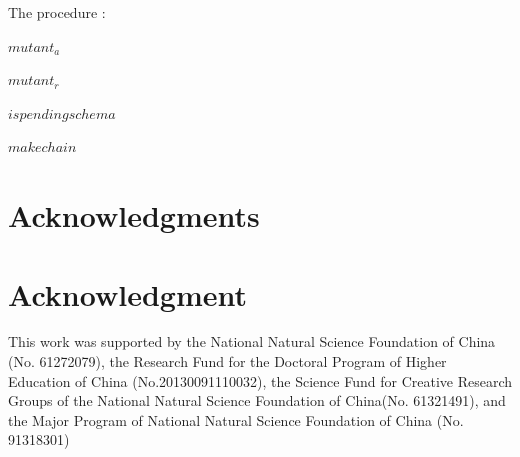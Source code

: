\documentclass[10pt,journal,cspaper,compsoc]{IEEEtran}
\begin{document}
The procedure :

$mutant_a$

$mutant_r$

$is pending schema$

$makechain$


\ifCLASSOPTIONcompsoc
  \section*{Acknowledgments}
\else
  \section*{Acknowledgment}
\fi


This work was supported by the National Natural Science Foundation of China (No. 61272079), the Research Fund for the Doctoral Program of Higher Education of China (No.20130091110032), the Science Fund for Creative Research Groups of the National Natural Science Foundation of China(No. 61321491), and the Major Program of National Natural Science Foundation of China (No. 91318301)

\ifCLASSOPTIONcaptionsoff
  \newpage
\fi








%
%
%
\end{document}
